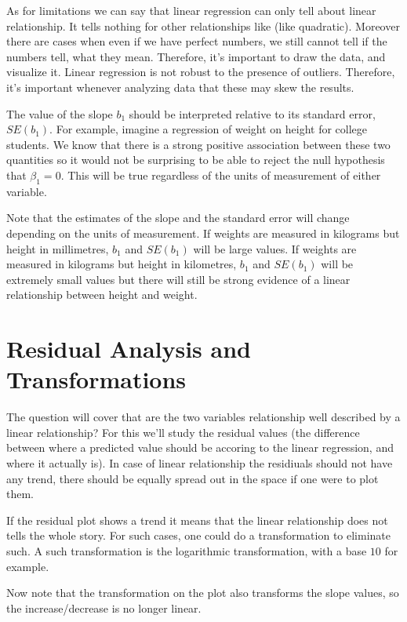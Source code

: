 As for limitations we can say that linear regression can only tell about linear
relationship. It tells nothing for other relationships like (like quadratic).
Moreover there are cases when even if we have perfect numbers, we  still cannot
tell if the numbers tell, what they mean. Therefore, it's important to draw the
data, and visualize it. Linear regression is not robust to the presence of
outliers. Therefore, it's important whenever analyzing data that these may skew
the results.

The value of the slope $b_1$ should be interpreted relative to its standard
error, $SE(b_1)$. For example, imagine a regression of weight on height for
college students. We know that there is a strong positive association between these two
quantities so it would not be surprising to be able to reject the null
hypothesis that $\beta_1=0$. This will be true regardless of the units of
measurement of either variable. 

Note that the estimates of the slope and the standard error will change
depending on the units of measurement. If weights are measured in kilograms but
height in millimetres, $b_1$ and $SE(b_1)$ will be large values. If weights are
measured in kilograms but height in kilometres, $b_1$ and $SE(b_1)$ will be
extremely small values but there will still be strong evidence of a linear
relationship between height and weight.

\section{Residual Analysis and Transformations}

The question will cover that are the two variables relationship well described
by a linear relationship? For this we'll study the residual values (the
difference between where a predicted value should be accoring to the linear
regression, and where it actually is). In case of linear relationship the
residiuals should not have any trend, there should be equally spread out in the
space if one were to plot them.

If the residual plot shows a trend it means that the linear relationship does
not tells the whole story. For such cases, one could do a transformation to
eliminate such. A such transformation is the logarithmic transformation, with a
base $10$ for example.

Now note that the transformation on the plot also transforms the slope values,
so the increase/decrease is no longer linear.